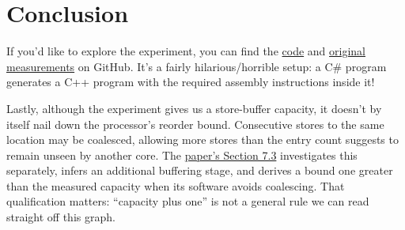 \documentclass[11pt]{article}
\begin{document}
\section{Conclusion}

If you'd like to explore the experiment, you can find the \href{https://github.com/nicknash/GuessStoreBuffer}{code} and \href{https://github.com/nicknash/GuessStoreBuffer/blob/master/results-500-nop.csv}{original measurements} on GitHub. It's a fairly hilarious/horrible setup: a C\# program generates a C++ program with the required assembly instructions inside it!

Lastly, although the experiment gives us a store-buffer capacity, it doesn't by itself nail down the processor's reorder bound. Consecutive stores to the same location may be coalesced, allowing more stores than the entry count suggests to remain unseen by another core. The \href{https://www.cs.tau.ac.il/~mad/publications/asplos2014-ffwsq.pdf}{paper's Section 7.3} investigates this separately, infers an additional buffering stage, and derives a bound one greater than the measured capacity when its software avoids coalescing. That qualification matters: ``capacity plus one'' is not a general rule we can read straight off this graph.
\end{document}
